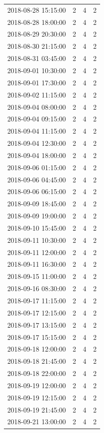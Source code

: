 \begin{tabular}{lrrr}
2018-08-28 15:15:00 & 2 & 4 & 2 \\
2018-08-28 18:00:00 & 2 & 4 & 2 \\
2018-08-29 20:30:00 & 2 & 4 & 2 \\
2018-08-30 21:15:00 & 2 & 4 & 2 \\
2018-08-31 03:45:00 & 2 & 4 & 2 \\
2018-09-01 10:30:00 & 2 & 4 & 2 \\
2018-09-01 17:30:00 & 2 & 4 & 2 \\
2018-09-02 11:15:00 & 2 & 4 & 2 \\
2018-09-04 08:00:00 & 2 & 4 & 2 \\
2018-09-04 09:15:00 & 2 & 4 & 2 \\
2018-09-04 11:15:00 & 2 & 4 & 2 \\
2018-09-04 12:30:00 & 2 & 4 & 2 \\
2018-09-04 18:00:00 & 2 & 4 & 2 \\
2018-09-06 01:15:00 & 2 & 4 & 2 \\
2018-09-06 04:45:00 & 2 & 4 & 2 \\
2018-09-06 06:15:00 & 2 & 4 & 2 \\
2018-09-09 18:45:00 & 2 & 4 & 2 \\
2018-09-09 19:00:00 & 2 & 4 & 2 \\
2018-09-10 15:45:00 & 2 & 4 & 2 \\
2018-09-11 10:30:00 & 2 & 4 & 2 \\
2018-09-11 12:00:00 & 2 & 4 & 2 \\
2018-09-11 16:30:00 & 2 & 4 & 2 \\
2018-09-15 11:00:00 & 2 & 4 & 2 \\
2018-09-16 08:30:00 & 2 & 4 & 2 \\
2018-09-17 11:15:00 & 2 & 4 & 2 \\
2018-09-17 12:15:00 & 2 & 4 & 2 \\
2018-09-17 13:15:00 & 2 & 4 & 2 \\
2018-09-17 15:15:00 & 2 & 4 & 2 \\
2018-09-18 12:00:00 & 2 & 4 & 2 \\
2018-09-18 21:45:00 & 2 & 4 & 2 \\
2018-09-18 22:00:00 & 2 & 4 & 2 \\
2018-09-19 12:00:00 & 2 & 4 & 2 \\
2018-09-19 12:15:00 & 2 & 4 & 2 \\
2018-09-19 21:45:00 & 2 & 4 & 2 \\
2018-09-21 13:00:00 & 2 & 4 & 2 \\

\end{tabular}
